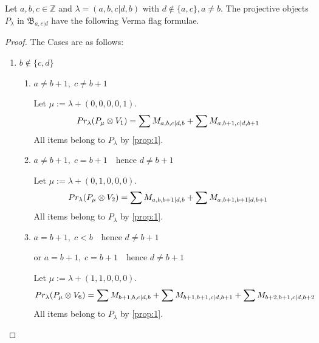 \begin{theorem}
  Let $a,b,c \in \mathbb{Z}$ and $\lambda = (a,b,c|d,b)$ with $d \notin \{a,c\}, a\neq b $. The projective objects $P_{\lambda}$ in $\mathfrak{B}_{a,c|d}$ have the following Verma flag formulae.
\end{theorem}
\begin{proof} The Cases are as follows:\par
  \begin{enumerate}
    \item $b \notin \{  c,d  \}$
      \begin{enumerate}
        \item $a \neq b+1, \; c \neq b+1$ \par
        Let $\mu:=\lambda + (0,0,0,0,1) $.
        \begin{equation}\notag
          \begin{aligned}
            Pr_{\lambda}(P_\mu \otimes V_{1}) &=
\sum M_{a,b,c|d,b}
+\sum M_{a,b+1,c|d,b+1}
          \end{aligned}
        \end{equation}
All items belong to $P_\lambda$ by \cref{prop:1}.


\item $a \neq b+1, \; c = b+1\quad \text{hence } d \neq b+1 $ \par
        Let $\mu:=\lambda + (0,1,0,0,0) $.
        \begin{equation}\notag
          \begin{aligned}
            Pr_{\lambda}(P_\mu \otimes V_{2}) &=
\sum M_{a,b,b+1|d,b}
+\sum M_{a,b+1,b+1|d,b+1}
          \end{aligned}
        \end{equation}
All items belong to $P_\lambda$ by \cref{prop:1}.

\item $a = b+1, \; c < b \quad \text{hence } d \neq b+1 $ \par
  $\text{or }a = b+1, \; c = b+1 \quad \text{hence } d \neq b+1$ \par
        Let $\mu:=\lambda + (1,1,0,0,0) $.
        \begin{equation}\notag
          \begin{aligned}
            Pr_{\lambda}(P_\mu \otimes V_{6}) &=
\sum M_{b+1,b,c|d,b}
+\sum M_{b+1,b+1,c|d,b+1}
+\sum M_{b+2,b+1,c|d,b+2}
          \end{aligned}
        \end{equation}
All items belong to $P_\lambda$ by \cref{prop:1}.


\end{enumerate}
\end{enumerate}
\end{proof}
